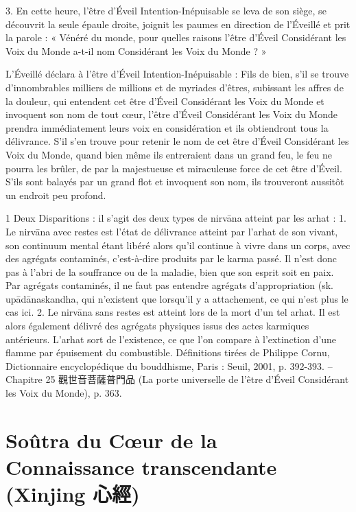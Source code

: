\begin{singlequote}
    3.	En cette heure, l’être d’Éveil Intention-Inépuisable se leva de son siège, se découvrit la seule épaule droite, joignit les paumes en direction de l’Éveillé et prit la parole : « Vénéré du monde, pour quelles raisons l’être d’Éveil Considérant les Voix du Monde a-t-il nom Considérant les Voix du Monde ? »

L’Éveillé déclara à l’être d’Éveil Intention-Inépuisable :
Fils de bien, s’il se trouve d’innombrables milliers de millions et de myriades d’êtres, subissant les affres de la douleur, qui entendent cet être d’Éveil Considérant les Voix du Monde et invoquent son nom de tout cœur, l’être d’Éveil Considérant les Voix du Monde prendra immédiatement leurs voix en considération et ils obtiendront tous la délivrance. S’il s’en trouve pour retenir le nom de cet être d’Éveil Considérant les Voix du Monde, quand bien même ils entreraient dans un grand feu, le feu ne pourra les brûler, de par la majestueuse et miraculeuse force de cet être d’Éveil.
S’ils sont balayés par un grand flot et invoquent son nom, ils trouveront aussitôt un endroit peu profond.


1 Deux Disparitions : il s’agit des deux types de nirvāna atteint par les arhat : 1. Le nirvāna avec restes est l’état de délivrance atteint par l’arhat de son vivant, son continuum mental étant libéré alors qu’il continue à vivre dans un corps, avec des agrégats contaminés, c’est-à-dire produits par le karma passé. Il n’est donc pas à l’abri de la souffrance ou de la maladie, bien que son esprit soit en paix. Par agrégats contaminés, il ne faut pas entendre agrégats d’appropriation (sk. upādānaskandha, qui n’existent que lorsqu’il y a attachement, ce qui n’est plus le cas ici. 2. Le nirvāna sans restes est atteint lors de la mort d’un tel arhat. Il est alors également délivré des agrégats physiques issus des actes karmiques antérieurs. L’arhat sort de l’existence, ce que l’on compare à l’extinction d’une flamme par épuisement du combustible. Définitions tirées de Philippe Cornu, Dictionnaire encyclopédique du bouddhisme, Paris : Seuil, 2001, p. 392-393.
-- Chapitre 25 觀世音菩薩普門品 (La porte universelle de l’être d’Éveil Considérant les
Voix du Monde), p. 363.
\end{singlequote}

 


\section{Soûtra du Cœur de la Connaissance transcendante
(Xinjing 心經)}


